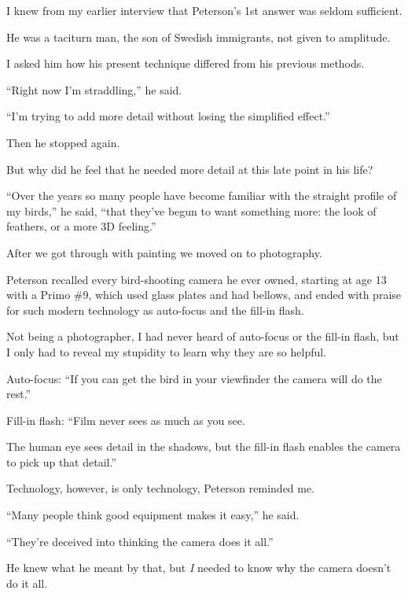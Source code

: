 \documentclass{book}
\numberwithin{equation}{section}
\begin{document}
%
I knew from my earlier interview that Peterson's 1st answer was seldom sufficient.

He was a taciturn man, the son of Swedish immigrants, not given to amplitude.

I asked him how his present technique differed from his previous methods.

%
``Right now I'm straddling,'' he said.

``I'm trying to add more detail without losing the simplified effect.''

Then he stopped again.

%
But why did he feel that he needed more detail at this late point in his life?

%
``Over the years so many people have become familiar with the straight profile of my birds,'' he said, ``that they've begun to want something more: the look of feathers, or a more 3D feeling.''

%
After we got through with painting we moved on to photography.

Peterson recalled every bird-shooting camera he ever owned, starting at age 13 with a Primo \#9, which used glass plates and had bellows, and ended with praise for such modern technology as auto-focus and the fill-in flash.

Not being a photographer, I had never heard of auto-focus or the fill-in flash, but I only had to reveal my stupidity to learn why they are so helpful.

Auto-focus: ``If you can get the bird in your viewfinder the camera will do the rest.''

Fill-in flash: ``Film never sees as much as you see.

The human eye sees detail in the shadows, but the fill-in flash enables the camera to pick up that detail.''

%
Technology, however, is only technology, Peterson reminded me.

``Many people think good equipment makes it easy,'' he said.

``They're deceived into thinking the camera does it all.''

He knew what he meant by that, but \textit{I} needed to know why the camera doesn't do it all.
\end{document}
